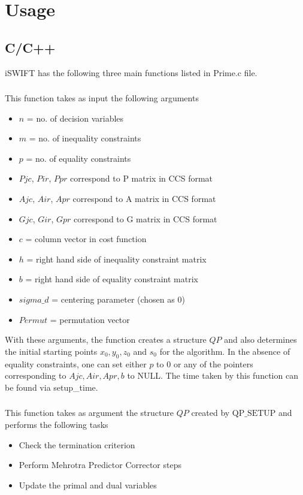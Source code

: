 \documentclass[10pt]{article}
\begin{document}
\section{Usage}
\subsection{C/C++}\label{c_usage}
iSWIFT has the following three main functions listed in Prime.c file.
\subsubsection{}
This function takes as input the following arguments
\begin{itemize}
	 \setlength{\itemsep}{1pt}%
	 \setlength{\parskip}{0pt}%
	\item $n$ = no. of decision variables
	\item $m$ = no. of inequality constraints
	\item $p$ = no. of equality constraints
	\item $Pjc$, $Pir$, $Ppr$ correspond to P matrix in CCS format
	\item $Ajc$, $Air$, $Apr$ correspond to A matrix in CCS format
	\item $Gjc$, $Gir$, $Gpr$ correspond to G matrix in CCS format
	\item $c$ = column vector in cost function
	\item $h$ = right hand side of inequality constraint matrix
	\item $b$ = right hand side of equality constraint matrix
	\item $sigma\_d$ = centering parameter (chosen as $0$)
	\item $Permut$ = permutation vector
\end{itemize}
	With these arguments, the function creates a structure $QP$ and also determines the initial starting points $x_0,y_0,z_0$ and $s_0$ for the algorithm. In the absence of  equality constraints, one can set either $p$ to $0$ or any of the pointers corresponding to $Ajc, Air, Apr, b$ to NULL. The time taken by this function can be found via setup\_time.
\subsubsection{}
This function takes as argument the structure $QP$ created by $\text{QP\_SETUP}$ and performs the following tasks
\begin{itemize}
	\setlength{\itemsep}{1pt}%
	\setlength{\parskip}{0pt}%
	\item Check the termination criterion
	\item Perform Mehrotra Predictor Corrector steps
	\item Update the primal and dual variables
\end{itemize}
\end{document}
